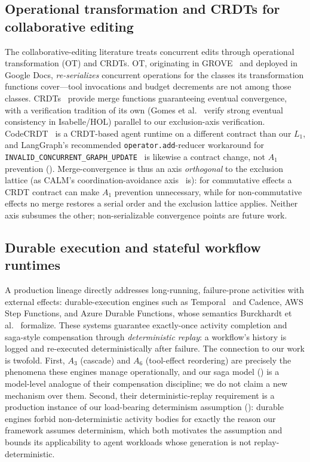 \documentclass[journal,compsoc,10pt]{IEEEtran}
\providecommand{\citep}{\cite}
\theoremstyle{definition}
\theoremstyle{remark}
\begin{document}
\subsection{Operational transformation and CRDTs for collaborative editing}
\label{sec:related-ot-crdt}
The collaborative-editing literature treats concurrent edits through
operational transformation (OT) and CRDTs. OT, originating in
GROVE~\citep{EllisGibbs1989Grove,EllisGibbsRein1991GROVE} and deployed in
Google Docs, \emph{re-serializes} concurrent operations for the classes its
transformation functions cover---tool invocations and budget decrements are
not among those classes. CRDTs~\citep{ShapiroEtAl2011CRDT} provide
merge functions guaranteeing eventual convergence, with a verification
tradition of its own (Gomes et al.~\citep{GomesEtAl2017SEC} verify strong
eventual consistency in Isabelle/HOL) parallel to our exclusion-axis
verification. CodeCRDT~\citep{Pugachev2025CodeCRDT} is a CRDT-based agent
runtime on a different contract than our $L_1$, and LangGraph's recommended
\texttt{operator.add}-reducer workaround for
\texttt{INVALID\_CONCURRENT\_GRAPH\_UPDATE}~\citep{LangGraphInvalidConcurrent}
is likewise a contract change, not $A_1$ prevention
(). Merge-convergence is thus an axis
\emph{orthogonal} to the exclusion lattice (as CALM's coordination-avoidance
axis~\citep{Hellerstein2020CALM} is): for commutative effects a CRDT
contract can make $A_1$ prevention unnecessary, while for non-commutative
effects no merge restores a serial order and the exclusion lattice applies.
Neither axis subsumes the other; non-serializable convergence points are
future work.

\subsection{Durable execution and stateful workflow runtimes}
\label{sec:related-durable}
A production lineage directly addresses long-running, failure-prone
activities with external effects: durable-execution engines such as
Temporal~\citep{TemporalIO} and Cadence, AWS Step Functions, and Azure
Durable Functions, whose semantics Burckhardt et
al.~\citep{BurckhardtEtAl2021Durable} formalize. These systems guarantee
exactly-once activity completion and saga-style compensation through
\emph{deterministic replay}: a workflow's history is logged and
re-executed deterministically after failure. The connection to our work is
twofold. First, $A_3$ (cascade) and $A_6$ (tool-effect reordering) are
precisely the phenomena these engines manage operationally, and our saga
model () is a model-level analogue of their
compensation discipline; we do not claim a new mechanism over them.
Second, their deterministic-replay requirement is a production instance of
our load-bearing determinism assumption (): durable
engines forbid non-deterministic activity bodies for exactly the reason
our framework assumes determinism, which both motivates the assumption and
bounds its applicability to agent workloads whose generation is not
replay-deterministic.
\end{document}
